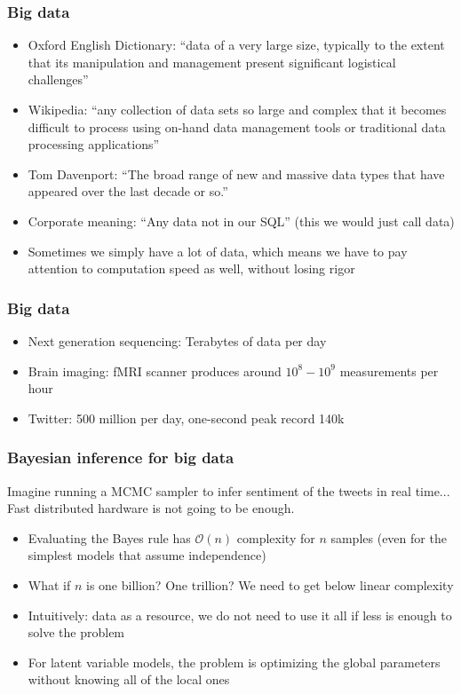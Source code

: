\documentclass{beamer}
\begin{document}
\begin{frame}
  \frametitle{Big data}

  \begin{itemize}
  \item Oxford English Dictionary: ``data of a very large size, typically to the extent that its manipulation and management present significant logistical challenges''
  \item Wikipedia: ``any collection of data sets so large and complex that it becomes difficult to process using on-hand data management tools or traditional data processing applications''
  \item Tom Davenport: ``The broad range of new and massive data types that have appeared over the last decade or so.''
  \item Corporate meaning: ``Any data not in our SQL'' (this we would just call data)
  \end{itemize}

  \begin{itemize}
  \item Sometimes we simply have a lot of data, which means we
    have to pay attention to computation speed as well, without losing
    rigor
  \end{itemize}
\end{frame}

\begin{frame}
  \frametitle{Big data}

  \begin{itemize}
    \item Next generation sequencing: Terabytes of data per day
    \item Brain imaging: fMRI scanner produces around $10^8-10^9$
      measurements per hour
    \item Twitter: 500 million per day, one-second peak record 140k
  \end{itemize}

\end{frame}

\begin{frame}
  \frametitle{Bayesian inference for big data}

  Imagine running a MCMC sampler to infer sentiment of the tweets
  in real time... Fast distributed hardware is not going to be enough.

  \begin{itemize}
  \item Evaluating the Bayes rule has $\mathcal{O}(n)$ complexity
    for $n$ samples (even for the simplest models that assume independence)
  \item What if $n$ is one billion? One trillion? We need to get below
    linear complexity
  \item Intuitively: data as a resource, we do not need to
    use it all if less is enough to solve the problem
  \item For latent variable models, the problem is optimizing the
    global parameters without knowing all of the local ones
  \end{itemize}
\end{frame}
\end{document}
